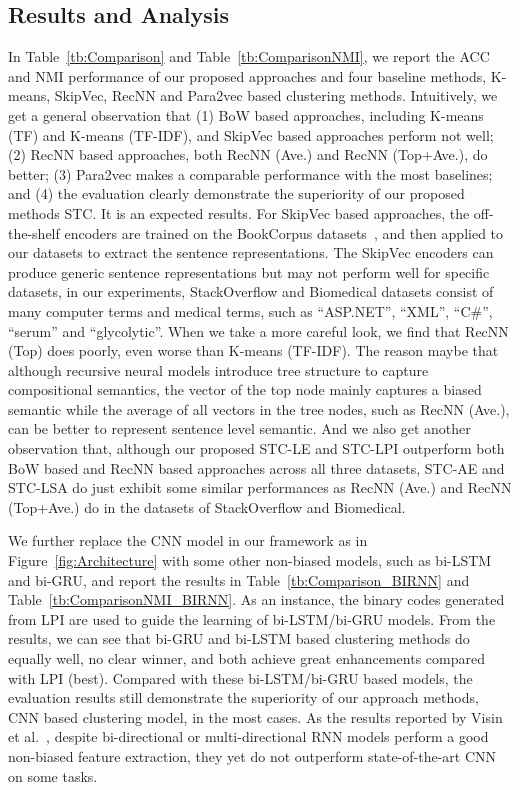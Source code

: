 \documentclass[review]{elsarticle}
\begin{document}
\subsection{Results and Analysis}
In Table~\ref{tb:Comparison} and Table~\ref{tb:ComparisonNMI}, we report the ACC and NMI performance of our proposed approaches and four baseline methods, K-means, SkipVec, RecNN and Para2vec based clustering methods. Intuitively, we get a general observation that (1) BoW based approaches, including K-means (TF) and K-means (TF-IDF), and SkipVec based approaches perform not well; (2) RecNN based approaches, both RecNN (Ave.) and RecNN (Top+Ave.), do better; (3) Para2vec makes a comparable performance with the most baselines; and (4) the evaluation clearly demonstrate the superiority of our proposed methods STC. It is an expected results.
For SkipVec based approaches, the off-the-shelf encoders are trained on the BookCorpus datasets~\cite{zhu2015aligning}, and then applied to our datasets to extract the sentence representations. The SkipVec encoders can produce generic sentence representations but may not perform well for specific datasets, in our experiments, StackOverflow and Biomedical datasets consist of many computer terms and medical terms, such as ``ASP.NET'', ``XML'', ``C\#'', ``serum'' and ``glycolytic''.
When we take a more careful look, we find that RecNN (Top) does poorly, even worse than K-means (TF-IDF). The reason maybe that although recursive neural models introduce tree structure to capture compositional semantics, the vector of the top node mainly captures a biased semantic while the average of all vectors in the tree nodes, such as RecNN (Ave.), can be better to represent sentence level semantic. And we also get another observation that, although our proposed STC-LE and STC-LPI outperform both BoW based and RecNN based approaches across all three datasets, STC-AE and STC-LSA do just exhibit some similar performances as RecNN (Ave.) and RecNN (Top+Ave.) do in the datasets of StackOverflow and Biomedical.

We further replace the CNN model in our framework as in Figure~\ref{fig:Architecture} with some other non-biased models, such as bi-LSTM and bi-GRU, and report the results in Table~\ref{tb:Comparison_BIRNN} and Table~\ref{tb:ComparisonNMI_BIRNN}. As an instance, the binary codes generated from LPI are used to guide the learning of bi-LSTM/bi-GRU models. From the results, we can see that bi-GRU and bi-LSTM based clustering methods do equally well, no clear winner, and both achieve great enhancements compared with LPI (best). Compared with these bi-LSTM/bi-GRU based models, the evaluation results still demonstrate the superiority of our approach methods, CNN based clustering model, in the most cases. As the results reported by Visin et al.~\cite{visin2015renet}, despite bi-directional or multi-directional RNN models perform a good non-biased feature extraction, they yet do not outperform state-of-the-art CNN on some tasks.
\end{document}
